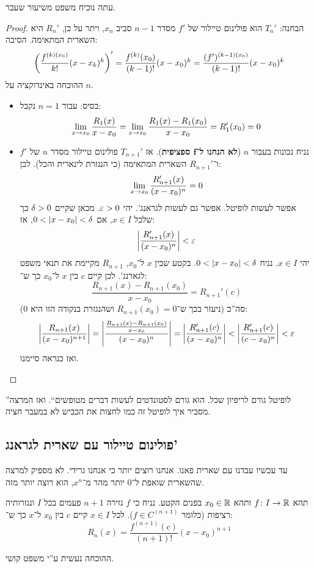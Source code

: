 \documentclass[name=רשימות חשבון דיפרנציאלי ואינטגרלי 1א]{../../../tex/classes/megasumPreamble}
\begin{document}
	עתה נוכיח משפט משיעור שעבר.
	\begin{proof}
		הבחנה: $T_n'$ הוא פולינום טיילור של $f'$ מסדר $n - 1$ סביב $x_n$, ויתר על כן, $R_n'$ היא השארית המתאימה. הסיבה:
		\[ \left ( \frac{f^{(k)(x_0)}}{k!}(x - x_k)^{k} \right )' = \frac{f^{(k)}(x_0)}{(k -1)!}(x -x_0)^{k} = \frac{(f')^{(k -1)(x_0)}}{(k - 1)!}(x -x_0)^{k} \]
		ההוכחה באינדוקציה על $n$.
		\begin{itemize}
			\item בסיס: עבור $n = 1$ נקבל:
			\[ \lim_{x \to x_0} \frac{R_1(x)}{x - x_0} = \lim_{x \to x_0} \frac{R_1(x) - R_1(x_0)}{x - x_0} = R_1'(x_0) = 0 \]
			\item נניח נכונות בעבור $n$ (\textbf{לא הנחנו ל־$\bm f$ ספציפית}). אז $T_{n + 1}'$ פולינום טיילור מסדר $n$ של $f'$ ו־$R_{n + 1}'$ השארית המתאימה (כי הנגזרת לינארית והכל). לכן:
			\[ \lim_{x \to x_0} \frac{R'_{n + 1}(x)}{(x - x_0)^{n}} = 0 \]
			אפשר לעשות לופיטל. אפשר גם לעשות לגראנג'. יהי $\eg > 0$. מכאן שקיים $\delta > 0$ כך שלכל $x \in I$, אם $0< \left \lvert x - x_0 \right \rvert < \delta$, אז:
			\[ \sof{\frac{R'_{n + 1}(x)}{(x - x_0)^{n}}} < \eg \]
			יהי $x \in I$. נניח $0 < \left \lvert x - x_0 \right \rvert < \delta$. בקטע שבין $x$ ל־$x_0$, $R_{n + 1}$ מקיימת את תנאי משפט לגארנג'. לכן קיים $c$ בין $x$ ל־$x_0$ כך ש־:
			\[ \frac{R_{n + 1}(x) - R_{n + 1}(x_0)}{x - x_0} = R_{n + 1}'(c) \]
			סה''כ (ניעזר בכך ש־$R_{n + 1}(x_0) = 0$ ושהנגזרת בנקודה הזו היא $0$):
			\[ \sof{\frac{R_{n + 1}(x)}{(x - x_0)^{n + 1}}} = \sof{\frac{\frac{R_{n + 1}(x) - R_{n + 1}(x_0)}{x - x_0}}{(x - x_0)^{n}}} = \sof{\frac{R'_{n + 1}(c)}{(x -x_0)^{n}}} < \sof{\frac{R'_{n + 1}(c)}{(c - x_0)^{n}}} < \eg \]
			ואז כנראה סיימנו.
		\end{itemize}
	\end{proof}
	''לופיטל גורם לריפיון שכל. הוא גורם לסטונדטים לעשות דברים מטופשים``. ואז המרצה מסביר איך לופיטל זה כמו לחצות את הכביש לא במעבר חציה.

	\subsection{פולינום טיילור עם שארית לגראנג'}
	עד עכשיו עבדנו עם שארית פאנו. אנחנו רוצים יותר כי אנחנו גרידי. לא מספיק למרצה שהשארית שואפת ל־$0$ יותר מהר מ־$x^{n}$, הוא רוצה יותר מזה.

	\begin{Theorem}
		תהא $f \colon I \to \mathbb{R}$ ותהא $x_0 \in \mathbb{R}$ בפנים הקטע. נניח כי $f$ גזירה $n + 1$ פעמים בכל $I$ ונגזרותיה רציפות (כלומר $f \in C^{(n + 1)}$). לכל $x \in I$ קיים $c$  בין $x_0$ ל־$x$ כך ש־:
		\[ R_{n}(x) = \frac{f^{(n + 1)}(c)}{(n + 1)!}(x - x_0)^{n + 1} \]
	\end{Theorem}
	ההוכחה נעשית ע''י משפט קושי.
\end{document}
